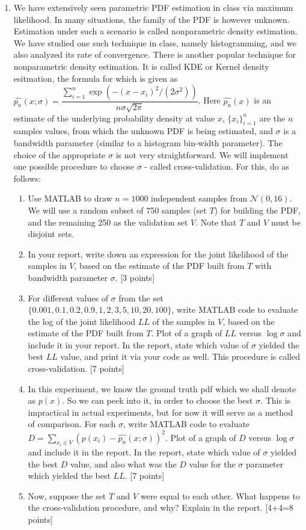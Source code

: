 \documentclass[11pt]{article}
\begin{document}
\begin{enumerate}
\item We have extensively seen parametric PDF estimation in class via maximum likelihood. In many situations, the family of the PDF is however unknown. Estimation under such a scenario is called nonparametric density estimation. We have studied one such technique in class, namely histogramming, and we also analyzed its rate of convergence. There is another popular technique for nonparametric density estimation. It is called KDE or Kernel density esitmation, the formula for which is given as $\hat{p_n}(x;\sigma) = \dfrac{\sum_{i=1}^n \exp{(-(x - x_i)^2/(2 \sigma^2))}}{n \sigma \sqrt{2 \pi}}$. Here $\hat{p_n}(x)$ is an estimate of the underlying probability density at value $x$, $\{x_i\}_{i=1}^n$ are the $n$ samples values, from which the unknown PDF is being estimated, and $\sigma$ is a bandwidth parameter (similar to a histogram bin-width parameter). The choice of the appropriate $\sigma$ is not very straightforward. We will implement one possible procedure to choose $\sigma$ - called cross-validation. For this, do as follows:
\begin{enumerate}
\item Use MATLAB to draw $n = 1000$ independent samples from $\mathcal{N}(0,16)$. We will use a random subset of 750 samples (set $T$) for building the PDF, and the remaining 250 as the validation set $V$. Note that $T$ and $V$ must be disjoint sets. 
\item In your report, write down an expression for the joint likelihood of the samples in $V$, based on the estimate of the PDF built from $T$ with bandwidth parameter $\sigma$. \textsf{[3 points]}
\item For different values of $\sigma$ from the set $\{0.001, 0.1, 0.2, 0.9, 1, 2, 3, 5, 10, 20, 100\}$, write MATLAB code to evaluate the log of the joint likelihood $LL$ of the samples in $V$, based on the estimate of the PDF built from $T$. Plot of a graph of $LL$ versus $\log \sigma$ and include it in your report. In the report, state which value of $\sigma$ yielded the best $LL$ value, and print it via your code as well.  This procedure is called cross-validation. \textsf{[7 points]}
\item In this experiment, we know the ground truth pdf which we shall denote as $p(x)$.  So we can peek into it, in order to choose the best $\sigma$. This is impractical in actual experiments, but for now it will serve as a method of comparison. For each $\sigma$, write MATLAB code to evaluate $D = \sum_{x_i \in V} (p(x_i)-\hat{p_n}(x;\sigma))^2$. Plot of a graph of $D$ versus $\log \sigma$ and include it in the report. In the report, state which value of $\sigma$ yielded the best $D$ value, and also what was the $D$ value for the $\sigma$ parameter which yielded the best $LL$. \textsf{[7 points]}
\item Now, suppose the set $T$ and $V$ were equal to each other. What happens to the cross-validation procedure, and why? Explain in the report. \textsf{[4+4=8 points]}
\end{enumerate}

\end{enumerate}
\end{document}
